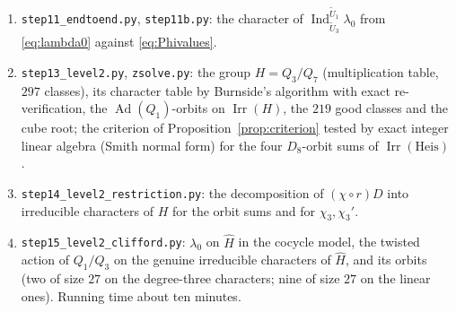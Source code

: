 \documentclass[11pt]{article}
\newcommand{\Irr}{\operatorname{Irr}}
\newcommand{\Ind}{\operatorname{Ind}}
\newcommand{\Ad}{\operatorname{Ad}}
\newcommand{\tU}{\widetilde U}
\theoremstyle{plain}
\theoremstyle{definition}
\begin{document}
\begin{enumerate}[label=\arabic*.]
relations in $\bar G_3$ against $e_*$; $\omega=0$; $\kappa_{1,5}$.
\item \texttt{step11\_endtoend.py}, \texttt{step11b.py}: the character
of $\Ind_{\tU_3}^{\tU_1}\lambda_0$ from \eqref{eq:lambda0} against
\eqref{eq:Phivalues}.
\item \texttt{step13\_level2.py}, \texttt{zsolve.py}: the group
$H=Q_3/Q_7$ (multiplication table, $297$ classes), its character table
by Burnside's algorithm with exact re-verification, the $\Ad(Q_1)$-orbits
on $\Irr(H)$, the $219$ good classes and the cube root; the criterion
of Proposition~\ref{prop:criterion} tested by exact integer linear
algebra (Smith normal form) for the four $D_8$-orbit sums of
$\Irr(\mathrm{Heis})$.
\item \texttt{step14\_level2\_restriction.py}: the decomposition of
$(\chi\circ r)D$ into irreducible characters of $H$ for the orbit sums
and for $\chi_3,\chi_3'$.
\item \texttt{step15\_level2\_clifford.py}: $\lambda_0$ on $\hat H$ in
the cocycle model, the twisted action of $Q_1/Q_3$ on the genuine
irreducible characters of $\hat H$, and its orbits (two of size $27$ on
the degree-three characters; nine of size $27$ on the linear ones).
Running time about ten minutes.
\end{enumerate}
\end{document}
